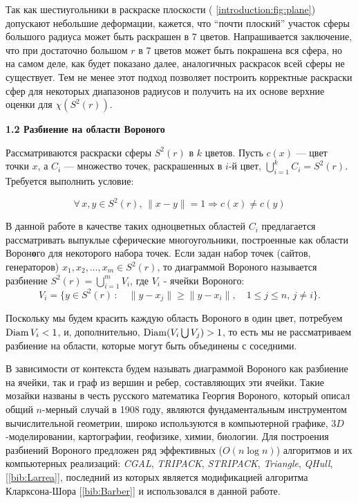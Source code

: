 Так как шестиугольники в раскраске плоскости (\figurename{ \ref{introduction:fig:plane}}) допускают небольшие деформации, кажется, что \enquote{почти плоский} участок сферы большого радиуса может быть раскрашен в $7$ цветов. Напрашивается заключение, что при достаточно большом $r$ в $7$ цветов может быть покрашена вся сфера, но на самом деле, как будет показано далее, аналогичных раскрасок всей сферы не существует. Тем не менее этот подход позволяет построить корректные 
раскраски сфер для некоторых диапазонов радиусов и получить на их основе верхние оценки для $\chi(S^2(r))$.

\vspace{5pt}
\textbf{1.2 Разбиение на области Вороного}\label{chapters:1.2}
\vspace{5pt}

Рассматриваются раскраски сферы $S^2(r)$ в $k$ цветов. Пусть $c(x)$  — цвет точки $x$, а $C_i$ — множество точек, раскрашенных в $i$-й цвет, $\bigcup\limits_{i=1}^{k} C_i = S^2(r)$. Требуется выполнить условие:

\begin{equation}\label{chapter1:propercoloring}
\forall \, x,y \in S^2(r), \, \|x - y\|=1 \Rightarrow c(x) \ne c(y)
\end{equation}

В данной работе в качестве таких одноцветных областей $C_i$ предлагается 
рассматривать выпуклые сферические многоугольники, построенные как области Ворон\textbf{о}го для некоторого набора точек.
Если задан набор точек (сайтов, генераторов) $x_1, x_2, \dots , x_m \in S^2(r)$, то диаграммой Вороного называется разбиение
$S^2(r)= \bigcup\limits_{i=1}^m V_i$, где $V_i$ - ячейки Вороного:
$$V_i = \{y \in S^2(r) \, : \quad \|y - x_j\| \geq \|y - x_i\|, \quad 1 \leq j \leq n, \, j \neq i \}.$$

Поскольку мы будем красить каждую область Вороного в один цвет, потребуем $\operatorname{Diam} V_i < 1$, и, 
дополнительно, $\operatorname{Diam} (V_i \bigcup V_j) > 1$, 
то есть мы не рассматриваем разбиение на области, которые могут быть объединены с соседними. 

В зависимости от контекста будем называть диаграммой Вороного как разбиение на ячейки, так и граф из вершин и ребер, составляющих эти ячейки. Такие мозайки названы в честь русского математика Георгия Вороного, который описал общий $n$-мерный случай в 1908 году,
являются фундаментальным инструментом вычислительной геометрии, широко используются в компьютерной графике, $3D$-моделировании, картографии, геофизике, химии, биологии. 
Для построения разбиений Вороного предложен ряд эффективных ($O(n\log{}n)$) алгоритмов и их компьютерных реализаций: 
\textit{CGAL}, \textit{TRIPACK}, \textit{STRIPACK}, \textit{Triangle}, \textit{QHull}, 
[\ref{bib:Larrea}], последний из которых является модификацией алгоритма Кларксона-Шора [\ref{bib:Barber}] и использовался в данной работе.

